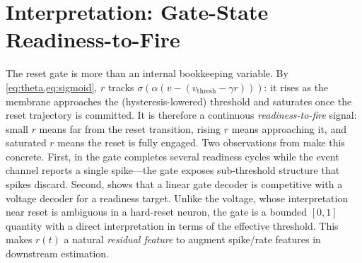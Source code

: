 \documentclass[journal]{IEEEtran}
\newcommand{\vth}{v_{\mathrm{thresh}}}
\begin{document}
\section{Interpretation: Gate-State Readiness-to-Fire}\label{sec:readiness}
The reset gate is more than an internal bookkeeping variable. By
\cref{eq:theta,eq:sigmoid}, $r$ tracks $\sigma(\alpha(v-(\vth-\gamma r)))$: it
rises as the membrane approaches the (hysteresis-lowered) threshold and saturates
once the reset trajectory is committed. It is therefore a continuous
\emph{readiness-to-fire} signal: small $r$ means far from the reset transition,
rising $r$ means approaching it, and saturated $r$ means the reset is fully
engaged. Two observations from  make this concrete. First, in
 the gate completes several readiness cycles while the event
channel reports a single spike---the gate exposes sub-threshold structure that
spikes discard. Second,  shows that a linear gate decoder is
competitive with a voltage decoder for a readiness target. Unlike the voltage,
whose interpretation near reset is ambiguous in a hard-reset neuron, the gate is
a bounded $[0,1]$ quantity with a direct interpretation in terms of the effective
threshold. This makes $r(t)$ a natural \emph{residual feature} to augment
spike/rate features in downstream estimation.

\end{document}
